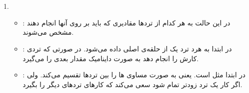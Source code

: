\section{}
\begin{enumerate}
    \item \begin{itemize}
        \item {}: در این حالت به هر کدام از ترد‌ها مقادیری که باید بر روی آنها
        انجام دهند مشخص می‌شوند.
        \item {}: در ابتدا به هرد ترد یک 
        از حلقه‌ی اصلی داده می‌شود. در صورتی که تردی کارش را انجام دهد به صورت داینامیک مقدار بعدی
        را می‌گیرد.
        \item {}: در ابتدا مثل  است.
        یعنی به صورت مساوی
        ها
        را بین ترد‌ها تقسیم می‌کند. ولی اگر کار یک ترد زودتر تمام شود سعی می‌کند که کار‌های ترد‌های دیگر را بگیرد.
    \end{itemize}
\end{enumerate}
